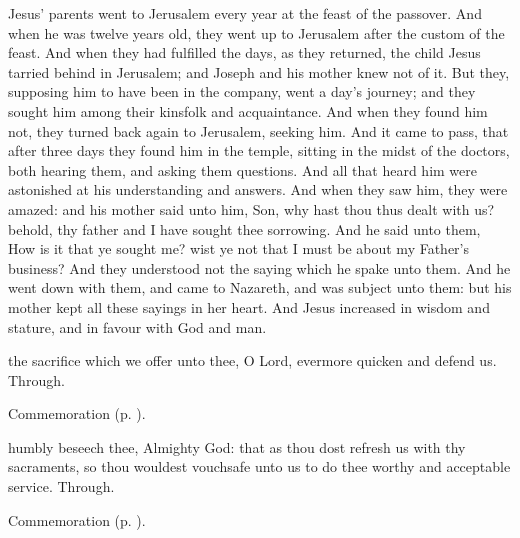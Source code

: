 \clearpage
{}
 Jesus' parents went to Jerusalem every year at the feast of the passover. And when he was twelve years old, they went up to Jerusalem after the custom of the feast. And when they had fulfilled the days, as they returned, the child Jesus tarried behind in Jerusalem; and Joseph and his mother knew not of it. But they, supposing him to have been in the company, went a day's journey; and they sought him among their kinsfolk and acquaintance. And when they found him not, they turned back again to Jerusalem, seeking him. And it came to pass, that after three days they found him in the temple, sitting in the midst of the doctors, both hearing them, and asking them questions. And all that heard him were astonished at his understanding and answers. And when they saw him, they were amazed: and his mother said unto him, Son, why hast thou thus dealt with us? behold, thy father and I have sought thee sorrowing. And he said unto them, How is it that ye sought me? wist ye not that I must be about my Father's business? And they understood not the saying which he spake unto them. And he went down with them, and came to Nazareth, and was subject unto them: but his mother kept all these sayings in her heart. And Jesus increased in wisdom and stature, and in favour with God and man.


\secret
{} the sacrifice which we offer unto thee, O Lord, evermore quicken and defend us. Through.


\begin{rubric}
    Commemoration  (p. \pageref{EpiphanyMassSecret}).
\end{rubric}


\postcommunion
{} humbly beseech thee, Almighty God: that as thou dost refresh us with thy sacraments, so thou wouldest vouchsafe unto us to do thee worthy and acceptable service. Through.

\begin{rubric}
    Commemoration  (p. \pageref{EpiphanyMassPostcommunion}).
\end{rubric}


